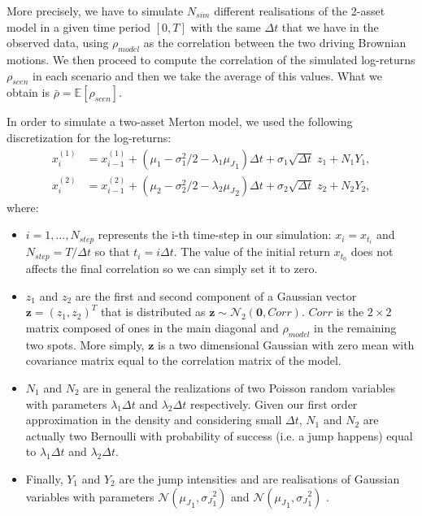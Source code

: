 More precisely, we have to simulate $N_{sim}$ different realisations of the 2-asset model in a given time period $[0, T]$ with the same $\Delta t$ that we have in the observed data, using $\rho_{model}$ as the correlation between the two driving Brownian motions. We then proceed to compute the correlation of the simulated log-returns $\rho_{scen}$ in each scenario and then we take the average of this values. What we obtain is $\bar{\rho} = \mathbb{E}[\rho_{scen}] $.

In order to simulate a two-asset Merton model, we used the following discretization for the log-returns:
\begin{subequations}
	\label{eq:merton_discretization}
	\begin{align}
	x_i^{(1)} &= x_{i-1}^{(1)} + (\mu_1 - \sigma_1^2/2 -\lambda_1 {\mu_J}_1) \Delta t + \sigma_1 \sqrt{\Delta t} \;  z_1 + N_1 {Y}_1 ,\\
	x_i^{(2)} &= x_{i-1}^{(2)} + (\mu_2 - \sigma_2^2/2 -\lambda_2 {\mu_J}_2) \Delta t + \sigma_2 \sqrt{\Delta t} \; z_2 + N_2 {Y}_2 ,
	\end{align}
\end{subequations} 
where:
\begin{itemize}
	\item $i = 1, \dots , N_{step}$ represents the i-th time-step in our simulation: $x_i = x_{t_i}$ and $N_{step} = T / \Delta t$ so that $t_i = i \Delta t$. The value of the initial return $x_{t_0}$ does not affects the final correlation so we can simply set it to zero.
	\item $z_1$ and $z_2$ are the first and second component of a Gaussian vector $\mathbf{z} = (z_1,z_2)^T$ that is distributed as $\mathbf{z} \sim \mathcal{N}_2(\mathbf{0}, Corr)$. $Corr$ is the $2 \times 2$ matrix composed of ones in the main diagonal and $\rho_{model}$ in the remaining two spots. 
	More simply, $\mathbf{z}$ is a two dimensional Gaussian with zero mean with covariance matrix equal to the correlation matrix of the model.
	\item $N_1$ and $N_2$ are in general the realizations of two Poisson random variables with parameters $\lambda_1 \Delta t$ and $\lambda_2 \Delta t$ respectively. Given our first order approximation in the density and considering small $\Delta t$,  $N_1$ and $N_2$ are actually two Bernoulli with probability of success (i.e. a jump happens) equal to $\lambda_1 \Delta t$ and $\lambda_2 \Delta t$.
	\item Finally, $Y_1$ and $Y_2$ are the jump intensities and are realisations of Gaussian variables with parameters $\mathcal{N}({\mu_J}_1, {\sigma_J}_1^2)$ and $\mathcal{N}({\mu_J}_1, {\sigma_J}_1^2)$ . 
\end{itemize}

